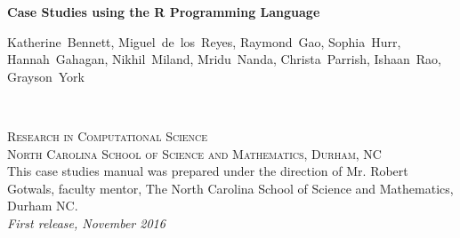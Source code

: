 \documentclass[11pt,fleqn]{book} %
\begin{document}

\begingroup
\thispagestyle{empty}
\centering
\vspace*{5cm}
\par\normalfont\fontsize{35}{35}\sffamily\selectfont
\textbf{Case Studies using the R Programming Language}\\
{\LARGE }\par %
\vspace*{1cm}
{\Large Katherine~Bennett, Miguel~de~los~Reyes, Raymond~Gao, Sophia~Hurr, Hannah~Gahagan, Nikhil~Miland, Mridu~Nanda, Christa~Parrish, Ishaan~Rao, Grayson~York }\par %
\endgroup


\newpage
~\vfill
\thispagestyle{empty}


\noindent \textsc{Research in Computational Science}\\

\noindent \textsc{North Carolina School of Science and Mathematics, Durham, NC}\\ %

\noindent This case studies manual was prepared under the direction of Mr. Robert Gotwals, faculty mentor, The North Carolina School of Science and Mathematics, Durham NC.  \\ %

\noindent \textit{First release, November 2016} %


\end{document}
